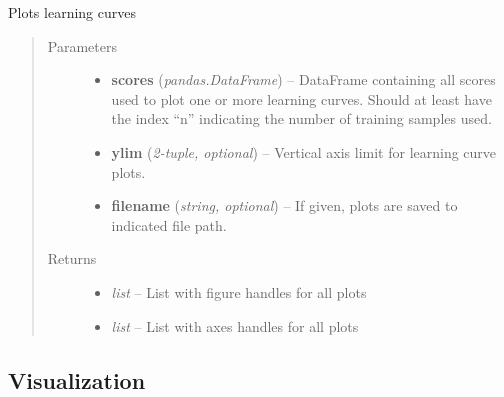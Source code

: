 \documentclass[letterpaper,10pt,english]{sphinxmanual}
\begin{document}

\begin{fulllineitems}
\label{flamingo/classification/index:flamingo.classification.test.plot_learning_curve}
Plots learning curves
\begin{quote}\begin{description}
\item[{Parameters}] \leavevmode\begin{itemize}
\item {} 
\textbf{scores} (\emph{pandas.DataFrame}) -- DataFrame containing all scores used to plot one or more learning curves.
Should at least have the index ``n'' indicating the number of training samples
used.

\item {} 
\textbf{ylim} (\emph{2-tuple, optional}) -- Vertical axis limit for learning curve plots.

\item {} 
\textbf{filename} (\emph{string, optional}) -- If given, plots are saved to indicated file path.

\end{itemize}

\item[{Returns}] \leavevmode
\begin{itemize}
\item {} 
\emph{list} --
List with figure handles for all plots

\item {} 
\emph{list} --
List with axes handles for all plots

\end{itemize}


\end{description}\end{quote}

\end{fulllineitems}



\subsection{Visualization}
\label{flamingo/classification/index:visualization}\label{flamingo/classification/index:module-flamingo.classification.plot}
\end{document}
